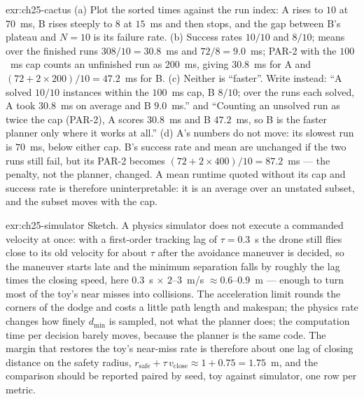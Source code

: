 \begin{solution}{exr:ch25-cactus}
(a) Plot the sorted times against the run index: A rises to $10$ at $70$~ms, B rises steeply to $8$ at $15$~ms and then stops, and the gap between B's plateau and $N = 10$ is its failure rate. (b) Success rates $10/10$ and $8/10$; means over the finished runs $308/10 = 30.8$~ms and $72/8 = 9.0$~ms; PAR-2 with the $100$~ms cap counts an unfinished run as $200$~ms, giving $30.8$~ms for A and $(72 + 2 \times 200)/10 = 47.2$~ms for B. (c) Neither is ``faster''. Write instead: ``A solved $10/10$ instances within the $100$~ms cap, B $8/10$; over the runs each solved, A took $30.8$~ms on average and B $9.0$~ms.'' and ``Counting an unsolved run as twice the cap (PAR-2), A scores $30.8$~ms and B $47.2$~ms, so B is the faster planner only where it works at all.'' (d) A's numbers do not move: its slowest run is $70$~ms, below either cap. B's success rate and mean are unchanged if the two runs still fail, but its PAR-2 becomes $(72 + 2 \times 400)/10 = 87.2$~ms --- the penalty, not the planner, changed. A mean runtime quoted without its cap and success rate is therefore uninterpretable: it is an average over an unstated subset, and the subset moves with the cap.
\end{solution}

\begin{solution}{exr:ch25-simulator}
Sketch. A physics simulator does not execute a commanded velocity at once: with a first-order tracking lag of $\tau = 0.3$~s the drone still flies close to its old velocity for about $\tau$ after the avoidance maneuver is decided, so the maneuver starts late and the minimum separation falls by roughly the lag times the closing speed, here $0.3$~s $\times$ $2$--$3$~m/s $\approx 0.6$--$0.9$~m --- enough to turn most of the toy's near misses into collisions. The acceleration limit rounds the corners of the dodge and costs a little path length and makespan; the physics rate changes how finely $d_{\min}$ is sampled, not what the planner does; the computation time per decision barely moves, because the planner is the same code. The margin that restores the toy's near-miss rate is therefore about one lag of closing distance on the safety radius, $r_{\mathrm{safe}} + \tau\,v_{\mathrm{close}} \approx 1 + 0.75 = 1.75$~m, and the comparison should be reported paired by seed, toy against simulator, one row per metric.
\end{solution}
